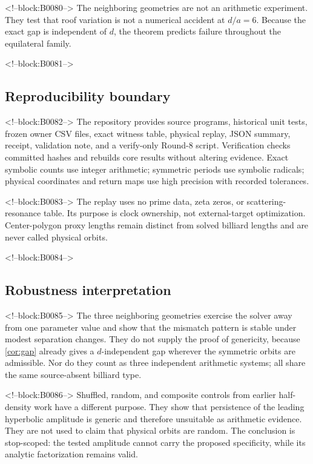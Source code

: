 \documentclass[11pt,a4paper]{article}
\theoremstyle{definition}
\theoremstyle{remark}
\begin{document}
<!--block:B0080-->
The neighboring geometries are not an arithmetic experiment. They test that roof variation is not a numerical accident at \(d/a=6\). Because the exact gap is independent of \(d\), the theorem predicts failure throughout the equilateral family.

<!--block:B0081-->
\subsection{Reproducibility boundary}

<!--block:B0082-->
The repository provides source programs, historical unit tests, frozen owner CSV files, exact witness table, physical replay, JSON summary, receipt, validation note, and a verify-only Round-8 script. Verification checks committed hashes and rebuilds core results without altering evidence. Exact symbolic counts use integer arithmetic; symmetric periods use symbolic radicals; physical coordinates and return maps use high precision with recorded tolerances.

<!--block:B0083-->
The replay uses no prime data, zeta zeros, or scattering-resonance table. Its purpose is clock ownership, not external-target optimization. Center-polygon proxy lengths remain distinct from solved billiard lengths and are never called physical orbits.

<!--block:B0084-->
\subsection{Robustness interpretation}

<!--block:B0085-->
The three neighboring geometries exercise the solver away from one parameter value and show that the mismatch pattern is stable under modest separation changes. They do not supply the proof of genericity, because \cref{cor:gap} already gives a \(d\)-independent gap wherever the symmetric orbits are admissible. Nor do they count as three independent arithmetic systems; all share the same source-absent billiard type.

<!--block:B0086-->
Shuffled, random, and composite controls from earlier half-density work have a different purpose. They show that persistence of the leading hyperbolic amplitude is generic and therefore unsuitable as arithmetic evidence. They are not used to claim that physical orbits are random. The conclusion is stop-scoped: the tested amplitude cannot carry the proposed specificity, while its analytic factorization remains valid.
\end{document}
